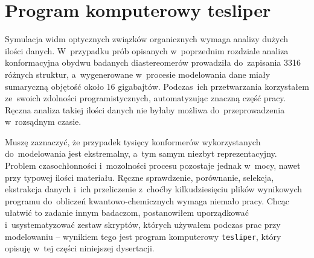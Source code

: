 \chapter{Program komputerowy tesliper}\label{chapter:tesliper}
Symulacja widm optycznych związków organicznych wymaga analizy dużych ilości danych.
W~przypadku prób opisanych w~poprzednim rozdziale
  analiza konformacyjna obydwu badanych diastereomerów prowadziła do~zapisania 3316 różnych struktur, a~wygenerowane w~procesie modelowania
  dane miały sumaryczną objętość około 16 gigabajtów.
Podczas~ich przetwarzania korzystałem ze~swoich zdolności programistycznych, automatyzując
  znaczną część pracy.
Ręczna analiza takiej ilości danych nie byłaby możliwa do~przeprowadzenia w~rozsądnym czasie.

Muszę zaznaczyć, że przypadek tysięcy konformerów wykorzystanych do~modelowania jest
  ekstremalny, a~tym samym niezbyt reprezentacyjny.
Problem czasochłonności i~mozolności procesu pozostaje jednak w~mocy,
  nawet przy typowej ilości materiału.
Ręczne sprawdzenie, porównanie, selekcja, ekstrakcja danych i~ich przeliczenie z~choćby
  kilkudziesięciu plików wynikowych programu do~obliczeń kwantowo-chemicznych wymaga
  niemało pracy.
Chcąc ułatwić to zadanie innym badaczom, postanowiłem uporządkować i~usystematyzować
  zestaw skryptów, których używałem podczas prac przy modelowaniu \--- wynikiem tego jest
  program komputerowy \texttt{tesliper}, który opisuję w~tej części niniejszej dysertacji.



